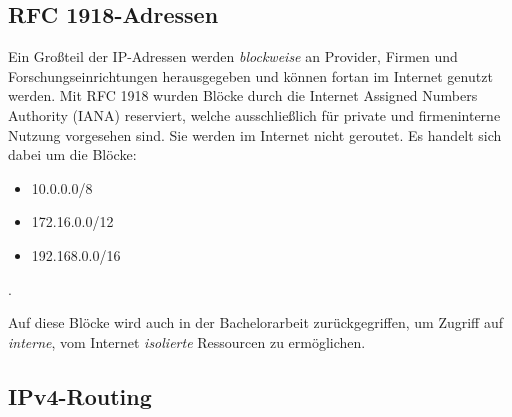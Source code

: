 \subsection{RFC 1918-Adressen}
Ein Großteil der IP-Adressen werden \textit{blockweise} an Provider, Firmen und Forschungseinrichtungen herausgegeben und können fortan im Internet genutzt werden. Mit RFC 1918  wurden Blöcke durch die Internet Assigned Numbers Authority (IANA) reserviert, welche ausschließlich für private und firmeninterne Nutzung vorgesehen sind. Sie werden im Internet nicht geroutet. Es handelt sich dabei um die Blöcke:
\begin{itemize}
\item 10.0.0.0/8
\item 172.16.0.0/12
\item 192.168.0.0/16
\end{itemize} \cite{rfc1918}.

Auf diese Blöcke wird auch in der Bachelorarbeit zurückgegriffen, um Zugriff auf \textit{interne}, vom Internet \textit{isolierte} Ressourcen zu ermöglichen.

\subsection{IPv4-Routing}

